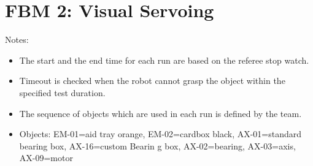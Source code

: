 \section*{FBM 2: Visual Servoing}


\noindent Notes:
\begin{itemize}
\item The start and the end time for each run are based on the referee stop watch.
\item Timeout is checked when the robot cannot grasp the object within the specified test duration.
\item The sequence of objects which are used in each run is defined by the team.
\item Objects: EM-01=aid tray orange, EM-02=cardbox black, AX-01=standard bearing box, AX-16=custom Bearin g box, AX-02=bearing, AX-03=axis, AX-09=motor
\end{itemize}

\vspace{0.5cm}


\newpage


